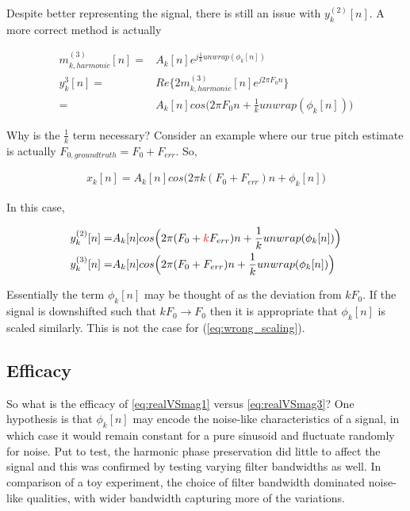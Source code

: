 \documentclass [11pt, proquest,oneside] {ganter_thesis}[2015/03/03]
\newcommand*{\mathcolor}{}
\def\mathcolor#1#{\mathcoloraux{#1}}
\newcommand*{\mathcoloraux}[3]{%
  \protect\leavevmode
  \begingroup
    \color#1{#2}#3%
  \endgroup
}
\begin{document}
Despite better representing the signal, there is still an issue with $y_k^{(2)}[n]$.  A more correct method is actually

\begin{align}
\label{eq:realVSmag3}
m^{(3)}_{k,harmonic}[n] =& A_k[n]e^{j\frac{1}{k} unwrap(\phi_k[n])} \\
y_k^3[n] =& Re\{ 2 m^{(3)}_{k,harmonic}[n] e^{j2\pi F_0 n} \}  \\
=& A_k[n]cos\Big(2\pi F_0 n + \frac{1}{k}unwrap(\phi_k[n])\Big) \nonumber
\end{align}


Why is the $\frac{1}{k}$ term necessary?  Consider an example where our true pitch estimate is actually $F_{0,ground truth} = F_0 + F_{err}$.  So,

\begin{align}
x_k[n] = A_k[n]cos\Big(2\pi k(F_0 + F_{err})n + \phi_k[n]\Big)
\end{align}

In this case,

\begin{align}
\label{eq:wrong_scaling}
y_k^{(2)}[n] =& A_k[n]cos\Big(2\pi (F_0 + \mathcolor{red}{k}F_{err})n + \frac{1}{k}unwrap(\phi_k[n])\Big) \\
y_k^{(3)}[n] =& A_k[n]cos\Big(2\pi (F_0 + F_{err})n + \frac{1}{k}unwrap(\phi_k[n])\Big)
\end{align}

Essentially the term $\phi_k[n]$ may be thought of as the deviation from $kF_0$.  If the signal is downshifted such that $kF_0 \longrightarrow F_0$ then it is appropriate that $\phi_k[n]$ is scaled similarly.  This is not the case for (\ref{eq:wrong_scaling}).

\subsection{Efficacy}


So what is the efficacy of \ref{eq:realVSmag1} versus \ref{eq:realVSmag3}?  One hypothesis is that $\phi_k[n]$ may encode the noise-like characteristics of a signal, in which case it would remain constant for a pure sinusoid and fluctuate randomly for noise.  Put to test, the harmonic phase preservation did little to affect the signal and this was confirmed by testing varying filter bandwidths as well.  In comparison of a toy experiment, the choice of filter bandwidth dominated noise-like qualities, with wider bandwidth capturing more of the variations.
\end{document}

